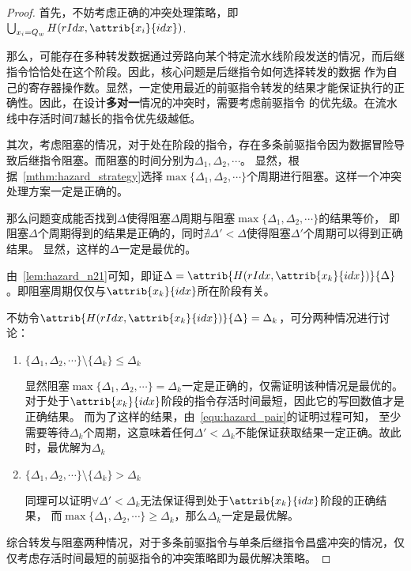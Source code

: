 \documentclass[hyperref,UTF8]{ctexart}
\theoremstyle{definition}
\theoremstyle{remark}
\numberwithin{equation}{subsection}
\newcommand{\Emph}{\textbf}
\begin{document}
	\begin{proof}
	首先，不妨考虑正确的冲突处理策略，即$\bigcup_{x_i = Q_w} {H(rIdx, \attrib{x_i}{idx})}$.
	
	那么，可能存在多种转发数据通过旁路向某个特定流水线阶段发送的情况，而后继指令恰恰处在这个阶段。因此，核心问题是后继指令如何选择转发的数据
	作为自己的寄存器操作数。显然，一定使用最近的前驱指令转发的结果才能保证执行的正确性。因此，在设计\Emph{多对一}情况的冲突时，需要考虑前驱指令
	的优先级。在流水线中存活时间$T$越长的指令优先级越低。
	
	其次，考虑阻塞的情况，对于处在阶段的指令，存在多条前驱指令因为数据冒险导致后继指令阻塞。而阻塞的时间分别为$\Delta_1, \Delta_2, \cdots$。
	显然，根据~\ref{mthm:hazard_strategy}选择$\max \{\Delta_1, \Delta_2, \cdots \}$个周期进行阻塞。这样一个冲突处理方案一定是正确的。
	
	那么问题变成能否找到$\Delta$使得阻塞$\Delta$周期与阻塞$\max \{\Delta_1, \Delta_2, \cdots \}$的结果等价，
	即阻塞$\Delta$个周期得到的结果是正确的，同时$\nexists \Delta' < \Delta$使得阻塞$\Delta'$个周期可以得到正确结果。
	显然，这样的$\Delta$一定是最优的。
	
	由~\ref{lem:hazard_n21}可知，即证$\Delta = \attrib{H(rIdx, \attrib{x_k}{idx})}{\Delta}$。即阻塞周期仅仅与$\attrib{x_k}{idx}$所在阶段有关。
	
	不妨令$\attrib{H(rIdx, \attrib{x_k}{idx})}{\Delta} = \Delta_k$，可分两种情况进行讨论：
	\begin{enumerate}[(1)]
	
		\item $\{\Delta_1, \Delta_2, \cdots \} \setminus \{\Delta_k\} \le \Delta_k$
		
		显然阻塞$\max \{\Delta_1, \Delta_2, \cdots \} = \Delta_k$一定是正确的，仅需证明该种情况是最优的。
		对于处于$\attrib{x_k}{idx}$阶段的指令存活时间最短，因此它的写回数值才是正确结果。
		而为了这样的结果，由~\ref{equ:hazard_pair}的证明过程可知，
		至少需要等待$\Delta_k$个周期，这意味着任何$\Delta' < \Delta_k$不能保证获取结果一定正确。故此时，最优解为$\Delta_k$
		
		\item $\{\Delta_1, \Delta_2, \cdots \} \setminus \{\Delta_k\} > \Delta_k$
		
		同理可以证明$\forall \Delta' < \Delta_k$无法保证得到处于$\attrib{x_k}{idx}$阶段的正确结果，
		而$\max \{\Delta_1, \Delta_2, \cdots \} \ge \Delta_k$，那么$\Delta_k$一定是最优解。
	
	\end{enumerate}
	
	综合转发与阻塞两种情况，对于多条前驱指令与单条后继指令昌盛冲突的情况，仅仅考虑存活时间最短的前驱指令的冲突策略即为最优解决策略。
	\end{proof}
	
\end{document}
